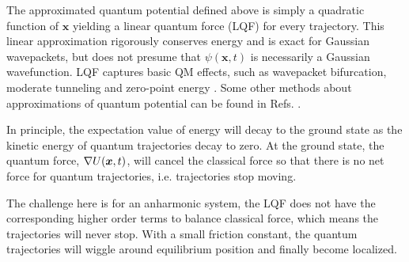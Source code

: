 \documentclass[11pt,letter,nocenter]{revtex4-1}
\begin{document}

The approximated quantum potential defined above is simply a quadratic function of $\bm{x}$ yielding a linear quantum force (LQF) for every trajectory.  
This linear approximation rigorously conserves energy and is exact for Gaussian wavepackets, but does not presume that $\psi(\bm{x},t)$ is necessarily a Gaussian wavefunction.  
LQF captures basic QM effects, such as wavepacket bifurcation, moderate tunneling and zero-point energy \cite{garashchuk_rcc}.
Some other methods about approximations of quantum potential can be found in  Refs. \cite{goldfarb2006,wyatt2000, kendrick2003, trahan2003}. 

In principle, the expectation value of energy will decay to the ground state as the kinetic energy of quantum trajectories decay to zero. At the ground state, the quantum force, $\nabla U(\bm x,t)$, will cancel the classical force so that there is no net force for quantum trajectories, i.e. trajectories stop moving. 

The challenge here is for an anharmonic system, 
the LQF does not have the corresponding higher order terms to balance classical force, which means the trajectories will never stop. With a small friction constant, the quantum trajectories will wiggle around equilibrium position and finally become localized.
\end{document}

